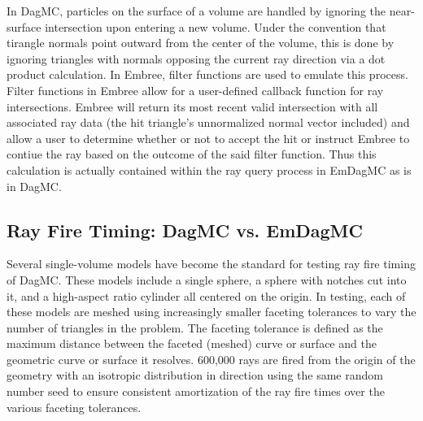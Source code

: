 \documentclass{anstrans}
\begin{document}
In DagMC, particles on the surface of a volume are handled by ignoring the near-surface intersection upon entering a new volume. Under the convention that tirangle normals point outward from the center of the volume, this is done by ignoring triangles with normals opposing the current ray direction via a dot product calculation. In Embree, filter functions are used to emulate this process. Filter functions in Embree allow for a user-defined callback function for ray intersections. Embree will return its most recent valid intersection with all associated ray data (the hit triangle's unnormalized normal vector included) and allow a user to determine whether or not to accept the hit or instruct Embree to contiue the ray based on the outcome of the said filter function. Thus this calculation is actually contained within the ray query process in EmDagMC as is in DagMC.



\subsection{Ray Fire Timing: DagMC vs. EmDagMC}

Several single-volume models have become the standard for testing ray fire timing of DagMC. These models include a single sphere, a sphere with notches cut into it, and a high-aspect ratio cylinder all centered on the origin. In testing, each of these models are meshed using increasingly smaller faceting tolerances to vary the number of triangles in the problem. The faceting tolerance is defined as the maximum distance between the faceted (meshed) curve or surface and the geometric curve or surface it resolves. 600,000 rays are fired from the origin of the geometry with an isotropic distribution in direction using the same random number seed to ensure consistent amortization of the ray fire times over the various faceting tolerances.
\end{document}
